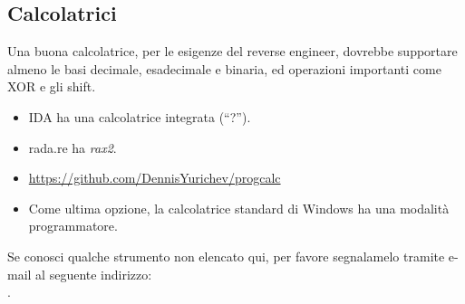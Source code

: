 

\subsection{Calcolatrici}

Una buona calcolatrice, per le esigenze del reverse engineer, dovrebbe supportare almeno le basi decimale, esadecimale e binaria,
ed operazioni importanti come XOR e gli shift.

\begin{itemize}

\item IDA ha una calcolatrice integrata (``?'').

\item rada.re ha \emph{rax2}.

\item \url{https://github.com/DennisYurichev/progcalc}

\item Come ultima opzione, la calcolatrice standard di Windows ha una modalità programmatore.

\end{itemize}


Se conosci qualche strumento non elencato qui, per favore segnalamelo tramite e-mail al seguente indirizzo:\\
\TT{\EMAIL}.
